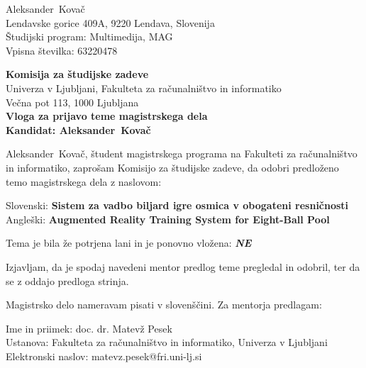 \documentclass[a4paper, 12pt]{article}
\begin{document}
\newcommand{\ImeKandidata}{Aleksander} %
\newcommand{\PriimekKandidata}{Kovač} %
\newcommand{\VpisnaStevilka}{63220478} %
\newcommand{\StudijskiProgram}{Multimedija, MAG} %
\newcommand{\NaslovBivalisca}{Lendavske gorice 409A, 9220 Lendava, Slovenija} %
\newcommand{\SLONaslov}{Sistem za vadbo biljard igre osmica v obogateni resničnosti} %
\newcommand{\ENGNaslov}{Augmented Reality Training System for Eight-Ball Pool} %

\newcommand{\Kandidat}{\ImeKandidata~\PriimekKandidata}
\noindent
\Kandidat\\
\NaslovBivalisca \\
Študijski program: \StudijskiProgram \\
Vpisna številka: \VpisnaStevilka
\bigskip

{\bf Komisija za študijske zadeve}\\
Univerza v Ljubljani, Fakulteta za računalništvo in informatiko\\
Večna pot 113, 1000 Ljubljana\\

{\Large\bf
{\centering
    Vloga za prijavo teme magistrskega dela \\%
\large Kandidat: \Kandidat \\[10mm]}}


\Kandidat, študent magistrskega programa na Fakulteti za računalništvo in informatiko, zaprošam Komisijo za študijske zadeve, da odobri predloženo temo magistrskega dela z naslovom:

Slovenski: {\bf \SLONaslov}\\
Angleški: {\bf \ENGNaslov}

Tema je bila že potrjena lani in je ponovno vložena: {\bf \textit{NE} }

Izjavljam, da je spodaj navedeni mentor predlog teme pregledal in odobril, ter da se z oddajo predloga strinja.

Magistrsko delo nameravam pisati v slovenščini. 
Za mentorja predlagam:

\hfill\begin{minipage}{\dimexpr\textwidth-2cm}
Ime in priimek: doc. dr. Matevž Pesek\\
Ustanova: Fakulteta za računalništvo in informatiko, Univerza v Ljubljani\\
Elektronski naslov: matevz.pesek@fri.uni-lj.si
\end{minipage}
\end{document}
